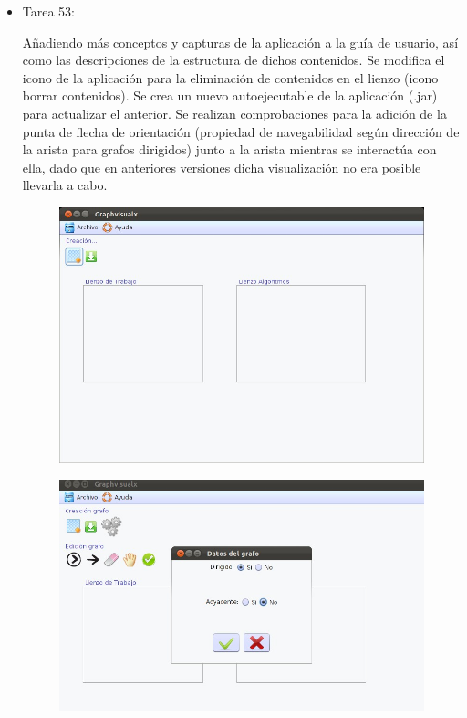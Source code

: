 \begin{itemize}
\item Tarea 53:

Añadiendo más conceptos y capturas de la aplicación a la guía de usuario, así como las descripciones de la estructura de dichos contenidos. Se modifica el icono de la aplicación para la eliminación de contenidos en el lienzo (icono borrar contenidos). Se crea un nuevo autoejecutable de la aplicación (.jar) para actualizar el anterior. Se realizan comprobaciones para la adición de la punta de flecha de orientación (propiedad de navegabilidad según dirección de la arista para grafos dirigidos) junto a la arista mientras se interactúa con ella, dado que en anteriores versiones dicha visualización no era posible llevarla a cabo. 
\begin{figure}[H]
\begin{center}
\includegraphics[width=14cm]{./imagenes_documentacion/Graphvisualx_18_1_2012/captura_1.jpeg}
\end{center}
\end{figure}
\newpage
\begin{figure}[H]
\begin{center}
\includegraphics[width=14cm]{./imagenes_documentacion/Graphvisualx_18_1_2012/captura_2.jpeg}

\end{center}
\end{figure}
\end{itemize}
